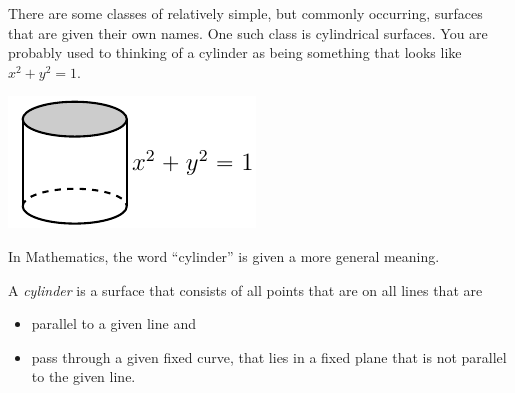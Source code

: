 There are some classes of relatively simple, but commonly occurring, 
surfaces that are given their own names. One such class is cylindrical surfaces.
You are probably used to thinking of a cylinder as being something that looks 
like $x^2+y^2=1$. 
\begin{efig}
\begin{center}
   \includegraphics{cylinderA.pdf}
\end{center}
\end{efig}
In Mathematics, the word ``cylinder'' is given a more general meaning.

\begin{defn}[Cylinder]\label{def cylinder}
A \emph{cylinder} is a surface that consists of all points that are 
on all lines that are
\begin{itemize}\itemsep1pt \parskip0pt 
\item   parallel to a given line and
\item   pass through a given fixed curve, that lies in a fixed plane that is not 
parallel to the given line.
\end{itemize}
\end{defn}

